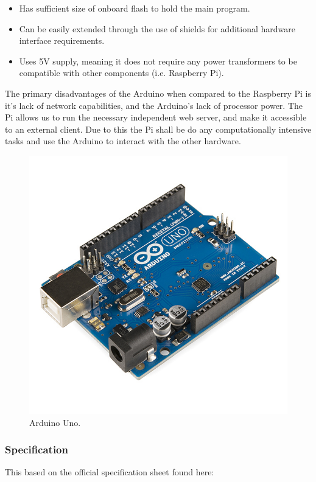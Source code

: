 \documentclass[12pt, a4paper]{article}
\begin{document}
\begin{itemize}
	\item Has sufficient size of onboard flash to hold the main program.
	\item Can be easily extended through the use of shields for additional
	hardware interface requirements.
	\item Uses 5V supply, meaning it does not require any power transformers to
	be compatible with other components (i.e. Raspberry Pi).
\end{itemize}

The primary disadvantages of the Arduino when compared to the Raspberry Pi is
it's lack of network capabilities, and the Arduino's lack of processor power.
The Pi allows us to run the necessary independent web server, and make it
accessible to an external client. Due to this the Pi shall be do any
computationally intensive tasks and use the Arduino to interact with the other
hardware.

\begin{figure}[H]
    \centering
    \includegraphics[scale = 0.25]{images/arduino-uno}
    \caption{Arduino Uno.\cite{ArduinoImage}}
    \label{fig:arduino_uno}
\end{figure}

\newpage

\subsubsection{Specification}
This based on the official specification sheet found here\cite{Arduino}:
\end{document}
